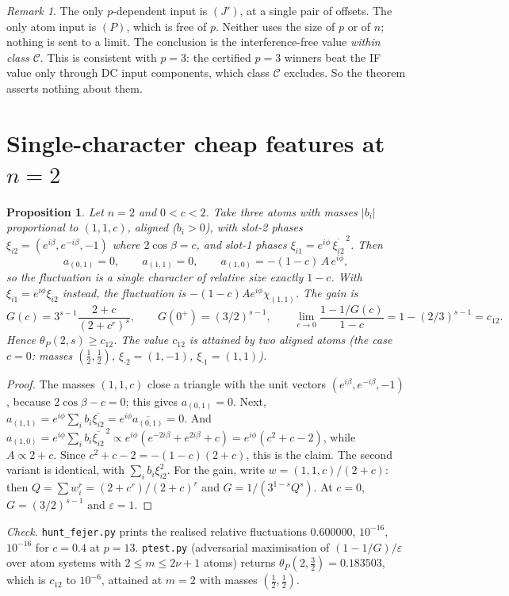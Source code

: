 \documentclass[11pt]{article}
\newtheorem{proposition}[theorem]{Proposition}
\theoremstyle{remark}
\newtheorem{remark}[theorem]{Remark}
\begin{document}
\begin{remark}
The only $p$-dependent input is $(J')$, at a single pair of offsets.  The only atom input is $(P)$, which is free of $p$.
Neither uses the size of $p$ or of $n$; nothing is sent to a limit.  The conclusion is the interference-free value
\emph{within class $\mathcal C$}.  This is consistent with $p=3$: the certified $p=3$ winners beat the IF value only through DC input
components, which class $\mathcal C$ excludes.  So the theorem asserts nothing about them.
\end{remark}

\section{Single-character cheap features at $n=2$}
\begin{proposition}\label{prop:single}
Let $n=2$ and $0<c<2$.  Take three atoms with masses $|b_i|$ proportional to $(1,1,c)$, aligned ($b_i>0$), with slot-2 phases
$\xi_{i2}=(e^{i\beta},e^{-i\beta},-1)$ where $2\cos\beta=c$, and slot-1 phases $\xi_{i1}=e^{i\phi}\,\overline{\xi_{i2}}^{\,2}$.  Then
\[a_{(0,1)}=0,\qquad a_{(1,1)}=0,\qquad a_{(1,0)}=-(1-c)\,A\,e^{i\phi},\]
so the fluctuation is a single character of relative size exactly $1-c$.  With $\xi_{i1}=e^{i\phi}\xi_{i2}$ instead, the
fluctuation is $-(1-c)Ae^{i\phi}\chi_{(1,1)}$.  The gain is
\[G(c)=3^{s-1}\frac{2+c}{(2+c^{r})^{s}},\qquad G(0^+)=(3/2)^{s-1},\qquad \lim_{c\to0}\frac{1-1/G(c)}{1-c}=1-(2/3)^{s-1}=c_{12}.\]
Hence $\theta_P(2,s)\ge c_{12}$.  The value $c_{12}$ is attained by two aligned atoms (the case $c=0$: masses $(\frac12,\frac12)$, $\xi_{\cdot2}=(1,-1)$, $\xi_{\cdot1}=(1,1)$).
\end{proposition}
\begin{proof}
The masses $(1,1,c)$ close a triangle with the unit vectors $(e^{i\beta},e^{-i\beta},-1)$, because $2\cos\beta-c=0$; this gives $a_{(0,1)}=0$.
Next, $a_{(1,1)}=e^{i\phi}\sum_ib_i\overline{\xi_{i2}}=e^{i\phi}\overline{a_{(0,1)}}=0$.  And
$a_{(1,0)}=e^{i\phi}\sum_ib_i\overline{\xi_{i2}}^{\,2}\propto e^{i\phi}(e^{-2i\beta}+e^{2i\beta}+c)=e^{i\phi}(c^2+c-2)$, while $A\propto2+c$.
Since $c^2+c-2=-(1-c)(2+c)$, this is the claim.  The second variant is identical, with $\sum_ib_i\xi_{i2}^2$.
For the gain, write $w=(1,1,c)/(2+c)$: then $Q=\sum w_i^r=(2+c^r)/(2+c)^r$ and $G=1/(3^{1-s}Q^s)$.  At $c=0$, $G=(3/2)^{s-1}$ and $\varepsilon=1$.
\end{proof}
\emph{Check.} \texttt{hunt\_fejer.py} prints the realised relative fluctuations $0.600000$, $10^{-16}$, $10^{-16}$ for $c=0.4$ at $p=13$.
\texttt{ptest.py} (adversarial maximisation of $(1-1/G)/\varepsilon$ over atom systems with $2\le m\le2\nu+1$ atoms) returns $\theta_P(2,\frac32)=0.183503$, which is $c_{12}$ to $10^{-6}$,
attained at $m=2$ with masses $(\frac12,\frac12)$.
\end{document}
